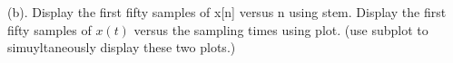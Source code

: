 (b). Display the first fifty samples of x[n] versus n using stem. Display the first fifty samples of $x(t)$ versus the sampling times using plot. (use subplot to simuyltaneously display these two plots.)
